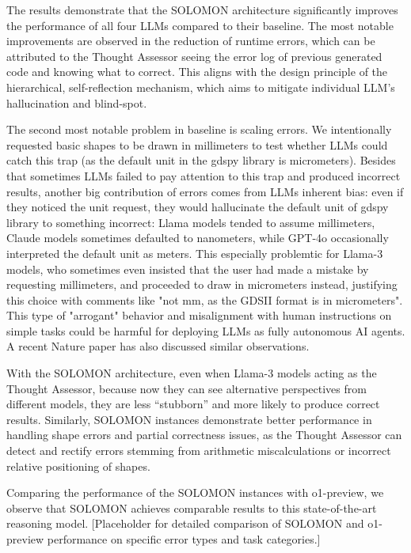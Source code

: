 \documentclass{article}
\begin{document}
The results demonstrate that the SOLOMON architecture significantly improves the performance of all four LLMs compared to their baseline. The most notable improvements are observed in the reduction of runtime errors, which can be attributed to the Thought Assessor seeing the error log of previous generated code and knowing what to correct. This aligns with the design principle of the hierarchical, self-reflection mechanism, which aims to mitigate individual LLM's hallucination and blind-spot.

The second most notable problem in baseline is scaling errors. We intentionally requested basic shapes to be drawn in millimeters to test whether LLMs could catch this trap (as the default unit in the gdspy library is micrometers). Besides that sometimes LLMs failed to pay attention to this trap and produced incorrect results, another big contribution of errors comes from LLMs inherent bias: even if they noticed the unit request, they would hallucinate the default unit of gdspy library to something incorrect: Llama models tended to assume millimeters, Claude models sometimes defaulted to nanometers, while GPT-4o occasionally interpreted the default unit as meters. This especially problemtic for Llama-3 models, who sometimes even insisted that the user had made a mistake by requesting millimeters, and proceeded to draw in micrometers instead, justifying this choice with comments like "not mm, as the GDSII format is in micrometers". This type of "arrogant" behavior and misalignment with human instructions on simple tasks could be harmful for deploying LLMs as fully autonomous AI agents. A recent Nature paper \cite{ZhouNature2024} has also discussed similar observations. 

With the SOLOMON architecture, even when Llama-3 models acting as the Thought Assessor, because now they can see alternative perspectives from different models, they are less ``stubborn'' and more likely to produce correct results. Similarly, SOLOMON instances demonstrate better performance in handling shape errors and partial correctness issues, as the Thought Assessor can detect and rectify errors stemming from arithmetic miscalculations or incorrect relative positioning of shapes.

Comparing the performance of the SOLOMON instances with o1-preview, we observe that SOLOMON achieves comparable results to this state-of-the-art reasoning model. [Placeholder for detailed comparison of SOLOMON and o1-preview performance on specific error types and task categories.]
\end{document}
